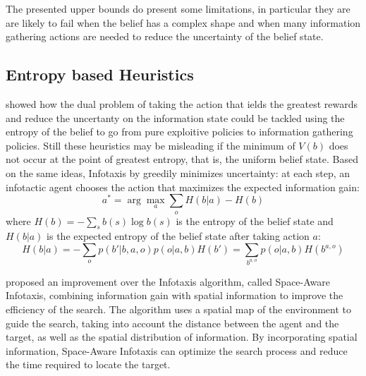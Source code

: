 The presented upper bounds do present some limitations, in particular they are are likely to
fail when the belief has a complex shape and when many information 
gathering actions are needed to reduce the uncertainty of the belief state.

\subsection{Entropy based Heuristics}
\cite{10.5555/926710} showed how the dual problem of taking the action that ields the 
greatest rewards and reduce the uncertanty on the information state could be tackled 
using the entropy of the belief to go from 
pure exploitive policies to information gathering policies.
Still these heuristics may be misleading if the minimum of $V(b)$ does not occur at 
the point of greatest entropy, that is, the uniform belief state.
Based on the same ideas, Infotaxis by \cite{PMID:17251974} greedily minimizes 
uncertainty: at each step, an infotactic agent chooses the 
action that maximizes the expected information gain:
$$a^* = \arg\max_a \sum_o H(b|a) - H(b)$$
where $H(b) = -\sum_s b(s) \log b(s)$ is the entropy of the belief state and 
$H(b|a)$ is the expected entropy of the belief state after taking action $a$:
$$H(b|a) = -\sum_o p(b'|b,a,o)p(o|a,b)H(b') = \sum_{b^{a,o}}p(o|a,b)H(b^{a,o})$$

\cite{e26040302} proposed an improvement over the Infotaxis algorithm, called Space-Aware Infotaxis, 
combining information gain with spatial information to improve the efficiency of the search.
The algorithm uses a spatial map of the environment to guide the search, taking into account the
distance between the agent and the target, as well as the spatial distribution of information.
By incorporating spatial information, Space-Aware Infotaxis can optimize the search process
and reduce the time required to locate the target. 






